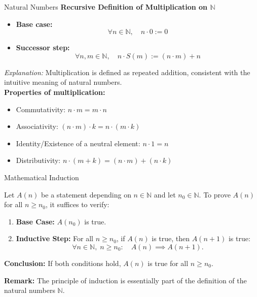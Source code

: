 \documentclass[dvipsnames]{beamer}
\theoremstyle{plain}
\theoremstyle{definition}
\begin{document}
\begin{frame}{Natural Numbers}
\textbf{Recursive Definition of Multiplication on $\mathbb{N}$}

\begin{itemize}
    \item \textbf{Base case:} 
    \[
        \forall n \in \mathbb{N}, \quad n \cdot 0 := 0
    \]
    \item \textbf{Successor step:} 
    \[
        \forall n,m \in \mathbb{N}, \quad n \cdot S(m) := (n \cdot m) + n
    \]
\end{itemize}
\textit{Explanation:} Multiplication is defined as repeated addition, consistent with the intuitive meaning of natural numbers. \\
\vspace{0.5em}
\textbf{Properties of multiplication:}
\begin{itemize}
    \item Commutativity: $n \cdot m = m \cdot n$
    \item Associativity: $(n \cdot m) \cdot k = n \cdot (m \cdot k)$
    \item Identity/Existence of a neutral element: $n \cdot 1 = n$  
    \item Distributivity: $n \cdot (m + k) = (n \cdot m) + (n \cdot k)$   
\end{itemize}
\end{frame}

\begin{frame}{Mathematical Induction}

\begin{definition}
Let $A(n)$ be a statement depending on $n \in \mathbb{N}$ and let $n_0 \in \mathbb{N}$.  
To prove $A(n)$ for all $n \ge n_0$, it suffices to verify:

\begin{enumerate}
    \item \textbf{Base Case:} $A(n_0)$ is true.
    \item \textbf{Inductive Step:} For all $n \ge n_0$, if $A(n)$ is true, then $A(n+1)$ is true:
    \[
    \forall n \in \mathbb{N},\; n \ge n_0 : \quad A(n) \implies A(n+1).
    \]
\end{enumerate}

\textbf{Conclusion:} If both conditions hold, $A(n)$ is true for all $n \ge n_0$.
\end{definition}
\textbf{Remark:} The principle of induction is essentially part of the definition of the natural numbers $\mathbb{N}$.
\end{frame}
\end{document}
